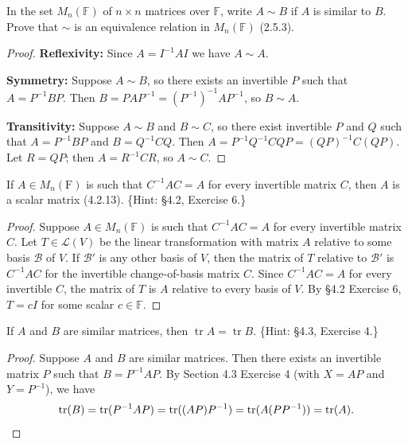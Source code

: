 \begin{tcolorbox}[title=Problem 3, breakable]
In the set $M_n(\mathbb{F})$ of $n \times n$ matrices over $\mathbb{F}$, 
write $A \sim B$ if $A$ is similar to $B$. Prove that $\sim$ is an equivalence relation in $M_n(\mathbb{F})$ (2.5.3).
\end{tcolorbox}

\begin{proof}
    \textbf{Reflexivity:} Since $A = I^{-1} A I$ we have $A \sim A$.

    \textbf{Symmetry:} Suppose $A \sim B$, so there exists an invertible $P$ such that
        $A = P^{-1} B P$.
    Then $B = P A P^{-1} = (P^{-1})^{-1} A P^{-1}$, so $B \sim A$.

    \textbf{Transitivity:} Suppose $A \sim B$ and $B \sim C$, so there exist invertible
        $P$ and $Q$ such that $A = P^{-1} B P$ and $B = Q^{-1} C Q$.
    Then $A = P^{-1} Q^{-1} C Q P = (QP)^{-1} C (QP)$.
    Let $R = QP$; then $A = R^{-1} C R$, so $A \sim C$.
\end{proof}

\begin{tcolorbox}[title=Problem 4, breakable]
If $A \in M_n(\text{F})$ is such that $C^{-1}AC = A$ 
for every invertible matrix $C$, then $A$ is a scalar matrix (4.2.13). 
\{Hint: \S4.2, Exercise 6.\}
\end{tcolorbox}

\begin{proof}
    Suppose $A \in M_n(\mathbb{F})$ is such that $C^{-1}AC = A$ for every invertible matrix $C$.
    Let $T \in \mathcal{L}(V)$ be the linear transformation with matrix $A$
        relative to some basis $\mathcal{B}$ of $V$.
    If $\mathcal{B}'$ is any other basis of $V$, then the matrix of $T$ relative to $\mathcal{B}'$
        is $C^{-1}AC$ for the invertible change-of-basis matrix $C$.
    Since $C^{-1}AC = A$ for every invertible $C$, the matrix of $T$ is $A$
        relative to every basis of $V$.
    By \S4.2 Exercise 6, $T = cI$ for some scalar $c \in \mathbb{F}$.
\end{proof}

\begin{tcolorbox}[title=Problem 5, breakable]
    If $A$ and $B$ are similar matrices, then $\operatorname{tr} A = \operatorname{tr} B$. \{Hint: \S4.3, Exercise 4.\}
\end{tcolorbox}

\begin{proof}
    Suppose $A$ and $B$ are similar matrices.
    Then there exists an invertible matrix $P$ such that $B = P^{-1}AP$.
    By Section 4.3 Exercise 4 (with $X = AP$ and $Y = P^{-1}$), we have
    \[
        \operatorname{tr}(B) = \operatorname{tr}(P^{-1}AP) = \operatorname{tr}((AP)P^{-1}) = \operatorname{tr}(A(PP^{-1})) = \operatorname{tr}(A). \qedhere
    \]
\end{proof}

